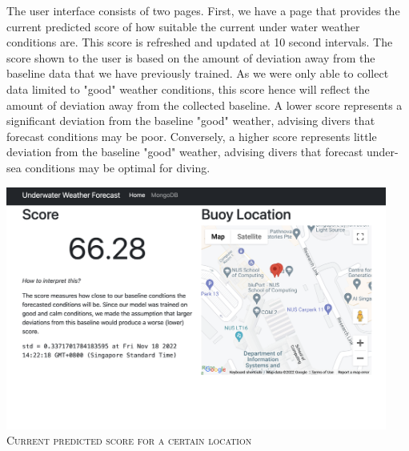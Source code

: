 \documentclass{article}
\begin{document}
\begin{multicols}{2}
    The user interface consists of two pages. First, we have a page that provides the current predicted score of how suitable the current under water weather conditions are. This score is refreshed and updated at 10 second intervals. The score shown to the user is based on the amount of deviation away from the baseline data that we have previously trained. As we were only able to collect data limited to "good" weather conditions, this score hence will reflect the amount of deviation away from the collected baseline. A lower score represents a significant deviation from the baseline "good" weather, advising divers that forecast conditions may be poor. Conversely, a higher score represents little deviation from the baseline "good" weather, advising divers that forecast under-sea conditions may be optimal for diving.

\begin{center}
\includegraphics[width=\columnwidth,height=8cm]{report/images/score.png}
    \textsc{Current predicted score for a certain location}
\end{center}
    

\end{multicols}
\end{document}
